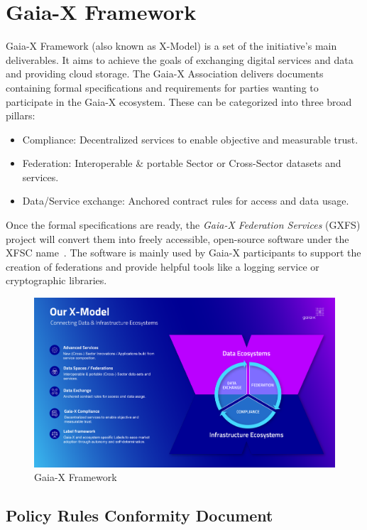 \section{Gaia-X Framework}\label{sec:gaia-x-framework}

Gaia-X Framework (also known as X-Model) is a set of the initiative's main deliverables.
It aims to achieve the goals of exchanging digital services and data and providing cloud storage.
The Gaia-X Association delivers documents containing formal specifications and requirements for parties wanting to participate in the Gaia-X ecosystem.
These can be categorized into three broad pillars:
\begin{itemize}
    \item Compliance: Decentralized services to enable objective and measurable trust.
    \item Federation: Interoperable \& portable Sector or Cross-Sector datasets and services.
    \item Data/Service exchange: Anchored contract rules for access and data usage.
\end{itemize}

Once the formal specifications are ready, the \textit{Gaia-X Federation Services} (GXFS) project will convert them into freely accessible, open-source software under the XFSC name~\cite{gxfs}.
The software is mainly used by Gaia-X participants to support the creation of federations and provide helpful tools like a logging service or cryptographic libraries.

\begin{figure}
    \centering
    \includegraphics[width=\textwidth]{figures/x-model.png}
    \caption{Gaia-X Framework~\cite{gaiax}}\label{fig:gaiax-x-model}
\end{figure}

\subsection{Policy Rules Conformity Document}\label{subsec:policy-rules-conformity-document}

